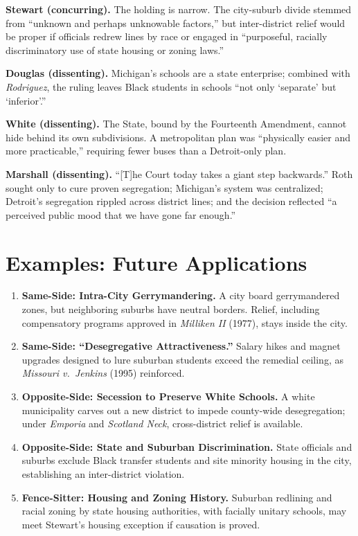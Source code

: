 \documentclass[12pt]{article}
\begin{document}
\textbf{Stewart (concurring).} The holding is narrow. The city-suburb divide stemmed from ``unknown and perhaps unknowable factors,'' but inter-district relief would be proper if officials redrew lines by race or engaged in ``purposeful, racially discriminatory use of state housing or zoning laws.''

\textbf{Douglas (dissenting).} Michigan's schools are a state enterprise; combined with \textit{Rodriguez}, the ruling leaves Black students in schools ``not only `separate' but `inferior'.''

\textbf{White (dissenting).} The State, bound by the Fourteenth Amendment, cannot hide behind its own subdivisions. A metropolitan plan was ``physically easier and more practicable,'' requiring fewer buses than a Detroit-only plan.

\textbf{Marshall (dissenting).} ``[T]he Court today takes a giant step backwards.'' Roth sought only to cure proven segregation; Michigan's system was centralized; Detroit's segregation rippled across district lines; and the decision reflected ``a perceived public mood that we have gone far enough.''

\section{Examples: Future Applications}

\begin{enumerate}
\item \textbf{Same-Side: Intra-City Gerrymandering.} A city board gerrymandered zones, but neighboring suburbs have neutral borders. Relief, including compensatory programs approved in \textit{Milliken II} (1977), stays inside the city.
\item \textbf{Same-Side: ``Desegregative Attractiveness.''} Salary hikes and magnet upgrades designed to lure suburban students exceed the remedial ceiling, as \textit{Missouri v.\ Jenkins} (1995) reinforced.
\item \textbf{Opposite-Side: Secession to Preserve White Schools.} A white municipality carves out a new district to impede county-wide desegregation; under \textit{Emporia} and \textit{Scotland Neck}, cross-district relief is available.
\item \textbf{Opposite-Side: State and Suburban Discrimination.} State officials and suburbs exclude Black transfer students and site minority housing in the city, establishing an inter-district violation.
\item \textbf{Fence-Sitter: Housing and Zoning History.} Suburban redlining and racial zoning by state housing authorities, with facially unitary schools, may meet Stewart's housing exception if causation is proved.
\end{enumerate}
\end{document}
